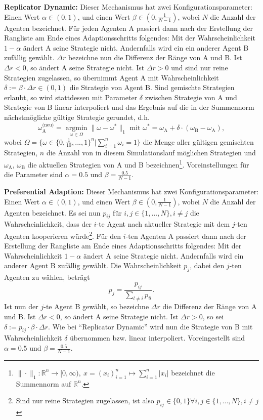 \documentclass[parskip=full,11pt]{scrartcl}
\def\adapt{Adaptionsschritt}
\begin{document}
\textbf{Replicator Dynamic:}
Dieser Mechanismus hat zwei Konfigurationsparameter: Einen Wert \(\alpha \in (0,1)\), und einen Wert \(\beta \in (0,\frac{1}{N-1})\), wobei \(N\) die Anzahl der Agenten bezeichnet. Für jeden Agenten A passiert dann nach der Erstellung der Rangliste am Ende eines \adapt s folgendes: Mit der Wahrscheinlichkeit \(1 - \alpha\) ändert A seine Strategie nicht. Andernfalls wird ein ein anderer Agent B zufällig gewählt. \(\Delta r\) bezeichne nun die Differenz der Ränge von A und B. Ist \(\Delta r < 0\), so ändert A seine Strategie nicht. Ist \(\Delta r > 0\) und sind nur reine Strategien zugelassen, so übernimmt Agent A mit Wahrscheinlichkeit \(\delta := \beta \cdot \Delta r \in (0,1)\) die Strategie von Agent B. Sind gemischte Strategien erlaubt, so wird stattdessen mit Parameter \(\delta\) zwischen Strategie von A und Strategie von B linear interpoliert und das Ergebnis auf die in der Summennorm nächstmögliche gültige Strategie gerundet, d.h.
\[
\omega_\text{A}^\text{(neu)} = \underset{\omega \in \Omega}{\operatorname{arg min}} \|\omega - \omega^*\|_1 \text{  mit  } \omega^* = \omega_\text{A} + \delta \cdot (\omega_\text{B} - \omega_\text{A}),
\]
wobei \(\Omega = \{\omega \in \{0,\frac{1}{10},...,1\}^n | \sum_{i=1}^n \omega_i = 1\}\) die Menge aller gültigen gemischten Strategien, \(n\) die Anzahl von in diesem Simulationslauf möglichen Strategien und \(\omega_\text{A}\), \(\omega_\text{B}\) die aktuellen Strategien von A und B bezeichnen\footnote{\(\|\cdot\|_1 : \mathbb{R}^n \rightarrow [0,\infty), \ x = (x_i)_{i=1}^n \mapsto \sum_{i=1}^n |x_i|\) bezeichnet die Summennorm auf \(\mathbb{R}^n\).}. Voreinstellungen für die Parameter sind \(\alpha = 0.5\) und \(\beta = \frac{0.5}{N - 1}\).

\textbf{Preferential Adaption:}
Dieser Mechanismus hat zwei Konfigurationsparameter: Einen Wert \(\alpha \in (0,1)\), und einen Wert \(\beta \in (0,\frac{1}{N-1})\), wobei \(N\) die Anzahl der Agenten bezeichnet. Es sei nun \(p_{ij}\) für \(i,j \in \{1,...,N\}, i \neq j\) die Wahrscheinlichkeit, dass der \(i\)-te Agent nach aktueller Strategie mit dem \(j\)-ten Agenten kooperieren würde\footnote{Sind nur reine Strategien zugelassen, ist also \(p_{ij} \in \{0,1\} \forall i,j \in \{1,...,N\}, i \neq j\)}. Für den \(i\)-ten Agenten A passiert dann nach der Erstellung der Rangliste am Ende eines \adapt s folgendes: Mit der Wahrscheinlichkeit \(1 - \alpha\) ändert A seine Strategie nicht. Andernfalls wird ein anderer Agent B zufällig gewählt. Die Wahrscheinlichkeit \(p_j\), dabei den \(j\)-ten Agenten zu wählen, beträgt
\[
p_j = \frac{p_{ij}}{\sum_{l \neq i} p_{il}}.
\]
Ist nun der \(j\)-te Agent B gewählt, so bezeichne \(\Delta r\) die Differenz der Ränge von A und B. Ist \(\Delta r < 0\), so ändert A seine Strategie nicht. Ist \(\Delta r > 0\), so sei \(\delta := p_{ij} \cdot \beta \cdot \Delta r\). Wie bei \enquote{Replicator Dynamic} wird nun die Strategie von B mit Wahrscheinlichkeit \(\delta\) übernommen bzw. linear interpoliert. Voreingestellt sind \(\alpha = 0.5\) und \(\beta = \frac{0.5}{N - 1}\).
\end{document}
